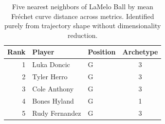 \begin{table}[htbp]
  \centering\small
  \begin{tabular}{rllc}
    \toprule
    Rank & Player & Position & Archetype \\
    \midrule
    1 & Luka Doncic & G & 3 \\
    2 & Tyler Herro & G & 3 \\
    3 & Cole Anthony & G & 3 \\
    4 & Bones Hyland & G & 1 \\
    5 & Rudy Fernandez & G & 3 \\
    \bottomrule
  \end{tabular}
  \caption{Five nearest neighbors of LaMelo Ball by mean Fr\'{e}chet curve distance across metrics. Identified purely from trajectory shape without dimensionality reduction.}
  \label{tab:LaMelo_Ball_frechet_curve_neighbors}
\end{table}

